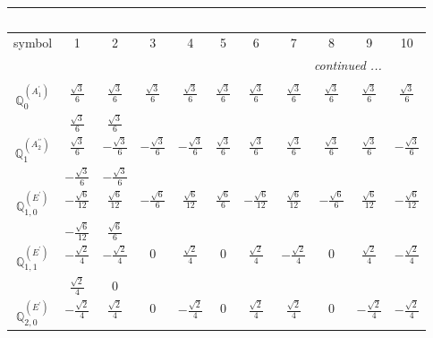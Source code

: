 \documentclass[fleqn,10pt,landscape]{article}
\begin{document}
\begin{itemize}
{\begin{center}
\begin{longtable}{ccccccccccc}
\multicolumn{10}{l}{\tablename\ \thetable{}} \\
 \hline \hline
symbol & 1 & 2 & 3 & 4 & 5 & 6 & 7 & 8 & 9 & 10 \\ \hline \endhead

 \hline \hline
\multicolumn{10}{r}{\footnotesize\it continued ...} \\ \endfoot

 \hline \hline
\multicolumn{10}{r}{} \\ \endlastfoot

$\mathbb{Q}_{0}^{(A_{1}^{\prime})}$ & $ \frac{\sqrt{3}}{6} $ & $ \frac{\sqrt{3}}{6} $ & $ \frac{\sqrt{3}}{6} $ & $ \frac{\sqrt{3}}{6} $ & $ \frac{\sqrt{3}}{6} $ & $ \frac{\sqrt{3}}{6} $ & $ \frac{\sqrt{3}}{6} $ & $ \frac{\sqrt{3}}{6} $ & $ \frac{\sqrt{3}}{6} $ & $ \frac{\sqrt{3}}{6} $ \\
& $ \frac{\sqrt{3}}{6} $ & $ \frac{\sqrt{3}}{6} $ & $  $ & $  $ & $  $ & $  $ & $  $ & $  $ & $  $ & $  $ \\ \hline
$\mathbb{Q}_{1}^{(A_{2}^{\prime\prime})}$ & $ \frac{\sqrt{3}}{6} $ & $ - \frac{\sqrt{3}}{6} $ & $ - \frac{\sqrt{3}}{6} $ & $ - \frac{\sqrt{3}}{6} $ & $ \frac{\sqrt{3}}{6} $ & $ \frac{\sqrt{3}}{6} $ & $ \frac{\sqrt{3}}{6} $ & $ \frac{\sqrt{3}}{6} $ & $ \frac{\sqrt{3}}{6} $ & $ - \frac{\sqrt{3}}{6} $ \\
& $ - \frac{\sqrt{3}}{6} $ & $ - \frac{\sqrt{3}}{6} $ & $  $ & $  $ & $  $ & $  $ & $  $ & $  $ & $  $ & $  $ \\ \hline
$\mathbb{Q}_{1,0}^{(E^{\prime})}$ & $ - \frac{\sqrt{6}}{12} $ & $ \frac{\sqrt{6}}{12} $ & $ - \frac{\sqrt{6}}{6} $ & $ \frac{\sqrt{6}}{12} $ & $ \frac{\sqrt{6}}{6} $ & $ - \frac{\sqrt{6}}{12} $ & $ \frac{\sqrt{6}}{12} $ & $ - \frac{\sqrt{6}}{6} $ & $ \frac{\sqrt{6}}{12} $ & $ - \frac{\sqrt{6}}{12} $ \\
& $ - \frac{\sqrt{6}}{12} $ & $ \frac{\sqrt{6}}{6} $ & $  $ & $  $ & $  $ & $  $ & $  $ & $  $ & $  $ & $  $ \\ \hline
$\mathbb{Q}_{1,1}^{(E^{\prime})}$ & $ - \frac{\sqrt{2}}{4} $ & $ - \frac{\sqrt{2}}{4} $ & $ 0 $ & $ \frac{\sqrt{2}}{4} $ & $ 0 $ & $ \frac{\sqrt{2}}{4} $ & $ - \frac{\sqrt{2}}{4} $ & $ 0 $ & $ \frac{\sqrt{2}}{4} $ & $ - \frac{\sqrt{2}}{4} $ \\
& $ \frac{\sqrt{2}}{4} $ & $ 0 $ & $  $ & $  $ & $  $ & $  $ & $  $ & $  $ & $  $ & $  $ \\ \hline
$\mathbb{Q}_{2,0}^{(E^{\prime})}$ & $ - \frac{\sqrt{2}}{4} $ & $ \frac{\sqrt{2}}{4} $ & $ 0 $ & $ - \frac{\sqrt{2}}{4} $ & $ 0 $ & $ \frac{\sqrt{2}}{4} $ & $ \frac{\sqrt{2}}{4} $ & $ 0 $ & $ - \frac{\sqrt{2}}{4} $ & $ - \frac{\sqrt{2}}{4} $ \\

\end{longtable}
\end{center}}
\end{itemize}
\end{document}

